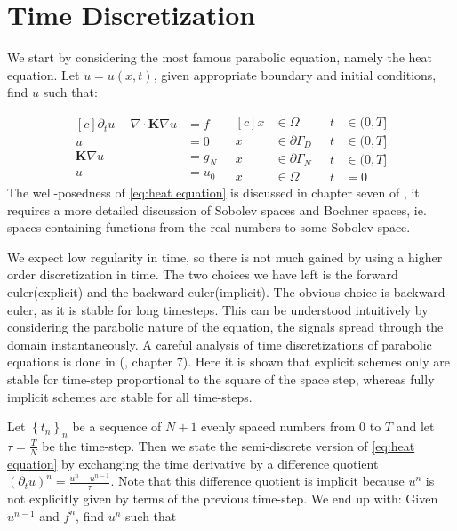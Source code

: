 \documentclass[../Main/main.tex]{subfiles}
\begin{document}
	\section*{Time Discretization}	
		We start by considering the most famous parabolic equation, namely the heat equation. Let $u = u(x,t)$, given appropriate boundary and initial conditions, find $u$ such that:
	
	\begin{equation}\label{eq:heat equation}
		\begin{aligned}[c]
			\partial_t u - \nabla \cdot \pmb{K} \nabla u &= f \\
			u &= 0 \\
			\pmb{K}\nabla u &= g_N\\
			u &= u_0
		\end{aligned}
		\ \ \
		\begin{aligned}[c]
			x &\in \Omega  \\
			x &\in \partial \Gamma_D \\
			x &\in \partial \Gamma_N \\
			x &\in \Omega  
		\end{aligned}
		\ \ \
		\begin{aligned}
			t&\in (0,T] \\
			t&\in (0,T] \\
			t&\in (0,T] \\
			t&=0
		\end{aligned}
	\end{equation}
	The well-posedness of \eqref{eq:heat equation} is discussed in chapter seven of \cite{evans10}, it requires a more detailed discussion of Sobolev spaces and Bochner spaces, ie. spaces containing functions from the real numbers to some Sobolev space.\par
	We expect low regularity in time, so there is not much gained by using a higher order discretization in time. The two choices we have left is the forward euler(explicit) and the backward euler(implicit). The obvious choice is backward euler, as it is stable for long timesteps. This can be understood intuitively by considering the parabolic nature of the equation, the signals spread through the domain instantaneously. A careful analysis of time discretizations of parabolic equations is done in (\cite{Knabner}, chapter 7).  Here it is shown that explicit schemes only are stable for time-step proportional to the square of the space step, whereas fully implicit schemes are stable for all time-steps. \par  Let $\left \{ t_n \right \}_n$ be a sequence of $N+1$ evenly spaced numbers from $0$ to $T$ and let $\tau = \frac{T}{N}$ be the time-step. Then we state the semi-discrete version of \eqref{eq:heat equation} by exchanging the time derivative by a difference quotient $(\partial_t u)^n = \frac{u^n-u^{n-1}}{\tau}$. Note that this difference quotient is implicit because $u^n$ is not explicitly given by terms of the previous time-step. We end up with: Given $u^{n-1}$ and $f^n$, find $u^n$ such that
\end{document}
